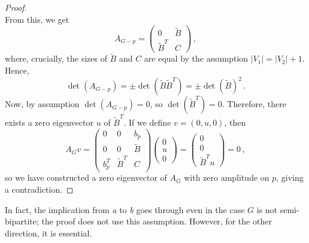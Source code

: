 \begin{proof}
\begin{equation*}
\end{equation*}
From this, we get
\begin{equation*}
    A_{G-p} =  \begin{pmatrix}  0 & \tilde{B} \\ \tilde{B}^T & C \end{pmatrix}\,,
\end{equation*}
where, crucially, the sizes of $ \tilde{B} $ and $C$ are equal by the assumption $ |V_1| = |V_2| + 1$. Hence,
\begin{equation*}
    \det (A_{G-p}) = \pm \det (\tilde{B} \tilde{B}^T ) = \pm \det (\tilde{B})^2\,.
\end{equation*}
Now, by assumption $ \det (A_{G-p}) =0$, so $ \det (\tilde{B}^T) = 0$. Therefore, there exists a zero eigenvector $u$ of $\tilde{B}^T$. If we define $v = (0, u, 0)$, then
\begin{equation*}
    A_{G} v = \begin{pmatrix} 0&0 & b_p \\ 0 & 0 & \tilde{B} \\ b_p^T & \tilde{B}^T & C \end{pmatrix} \begin{pmatrix}0 \\ u \\ 0 \end{pmatrix} = \begin{pmatrix} 0 \\ 0 \\ \tilde{B}^T u\end{pmatrix} =0\,,
\end{equation*}
so we have constructed a zero eigenvector of $A_G$ with zero amplitude on $p$, giving a contradiction.
\end{proof}

\begin{remark}\label{Implicationatob}
In fact, the implication from \emph{a} to \emph{b} goes through even in the case $G$ is not semi-bipartite; the proof does not use this assumption. However, for the other direction, it is essential.
\end{remark}



